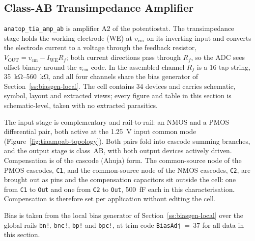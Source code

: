 %
%
%

\subsection{Class-AB Transimpedance Amplifier}\label{ss:tiaampab}

\texttt{anatop\_tia\_amp\_ab} is amplifier A2 of the potentiostat. The
transimpedance stage holds the working electrode (WE) at $v_{\mathrm{cm}}$ on its
inverting input and converts the electrode current to a voltage through the feedback
resistor, $V_{\mathrm{OUT}} = v_{\mathrm{cm}} - I_{\mathrm{WE}} R_f$; both current
directions pass through $R_f$, so the ADC sees offset binary around the
$v_{\mathrm{cm}}$ code. In the assembled channel $R_f$ is a 16-tap string,
\SIrange{35}{560}{\kilo\ohm}, and all four channels share the bias generator of
Section~\ref{ss:biasgen-local}. The cell contains 34 devices and carries schematic,
symbol, layout and extracted views; every figure and table in this section is
schematic-level, taken with no extracted parasitics.

The input stage is complementary and rail-to-rail: an NMOS and a PMOS differential
pair, both active at the \SI{1.25}{\volt} input common mode
(Figure~\ref{fig:tiaampab-topology}). Both pairs fold into cascode summing branches,
and the output stage is class~AB, with both output devices actively driven.
Compensation is of the cascode (Ahuja) form. The common-source node of the PMOS
cascodes, \texttt{C1}, and the common-source node of the NMOS cascodes, \texttt{C2},
are brought out as pins and the compensation capacitors sit outside the cell: one
from \texttt{C1} to \texttt{Out} and one from \texttt{C2} to \texttt{Out},
\SI{500}{\femto\farad} each in this characterisation. Compensation is therefore set
per application without editing the cell.

Bias is taken from the local bias generator of Section~\ref{ss:biasgen-local} over
the global rails \texttt{bn!}, \texttt{bnc!}, \texttt{bp!} and \texttt{bpc!}, at trim
code \texttt{BiasAdj}~=~37 for all data in this section.

